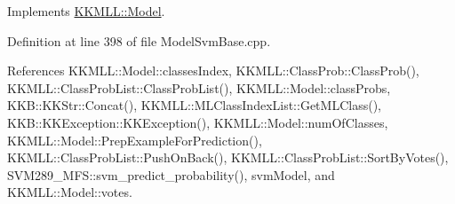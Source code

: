 Implements \hyperlink{class_k_k_m_l_l_1_1_model_a8d5638034838f63a5091978166d99d04}{K\+K\+M\+L\+L\+::\+Model}.



Definition at line 398 of file Model\+Svm\+Base.\+cpp.



References K\+K\+M\+L\+L\+::\+Model\+::classes\+Index, K\+K\+M\+L\+L\+::\+Class\+Prob\+::\+Class\+Prob(), K\+K\+M\+L\+L\+::\+Class\+Prob\+List\+::\+Class\+Prob\+List(), K\+K\+M\+L\+L\+::\+Model\+::class\+Probs, K\+K\+B\+::\+K\+K\+Str\+::\+Concat(), K\+K\+M\+L\+L\+::\+M\+L\+Class\+Index\+List\+::\+Get\+M\+L\+Class(), K\+K\+B\+::\+K\+K\+Exception\+::\+K\+K\+Exception(), K\+K\+M\+L\+L\+::\+Model\+::num\+Of\+Classes, K\+K\+M\+L\+L\+::\+Model\+::\+Prep\+Example\+For\+Prediction(), K\+K\+M\+L\+L\+::\+Class\+Prob\+List\+::\+Push\+On\+Back(), K\+K\+M\+L\+L\+::\+Class\+Prob\+List\+::\+Sort\+By\+Votes(), S\+V\+M289\+\_\+\+M\+F\+S\+::svm\+\_\+predict\+\_\+probability(), svm\+Model, and K\+K\+M\+L\+L\+::\+Model\+::votes.


